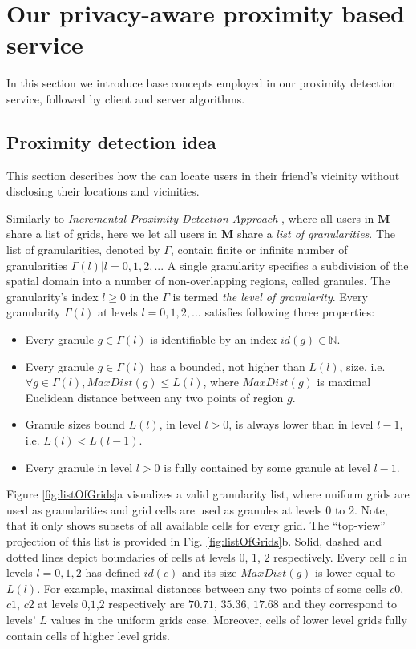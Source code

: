 \section{Our privacy-aware proximity based service} \label{sec:contribution}

In this section we introduce base concepts employed in our proximity detection
service, followed by client and server algorithms. 

\subsection{Proximity detection idea}

This section describes how the \ls can locate users in their friend's vicinity
without disclosing their locations and vicinities. 

Similarly to \textit{Incremental Proximity Detection Approach} \cite {ffinder},
where all users in $\mathbf{M}$ share a list of grids, here we let all users in
$\mathbf{M}$ share a \textit{list of granularities}. The list of granularities,
denoted by $\Gamma$, contain finite or infinite number of granularities
$\Gamma(l)| l=0, 1, 2,...$  A single granularity
specifies a subdivision of the spatial domain
into a number of non-overlapping regions, called granules\cite{pbsPaper}. The
granularity's index $l \geq 0$ in the $\Gamma$ is termed \textit{the level of
granularity}. Every granularity $\Gamma(l)$ at levels $l=0, 1, 2,...$ satisfies
following three properties:
\begin{itemize}
 \item Every granule $g \in \Gamma(l)$ is identifiable by an index $id(g)
\in \mathbb{N}$.
 \item Every granule $g \in \Gamma(l)$ has a bounded, not higher than $L(l)$,
size, i.e. $\forall g \in \Gamma(l), MaxDist(g) \leq L(l)$, where $MaxDist(g)$
is maximal Euclidean distance between any two points of region $g$.
 \item Granule sizes bound $L(l)$, in level $l>0$, is always lower than in level
$l-1$, i.e. $L(l) < L(l-1)$.
 \item Every granule in level $l>0$ is fully contained by some granule at 
level $l-1$.
\end{itemize}

Figure \ref{fig:listOfGrids}a visualizes a valid granularity
list, where uniform grids are used as granularities and grid cells are used as
granules at levels $0$ to $2$. Note, that it only shows subsets of all
available cells for every grid. The ``top-view'' projection of this list is
provided in Fig. \ref{fig:listOfGrids}b. Solid, dashed and dotted lines depict
boundaries of cells at levels $0$, $1$, $2$ respectively. Every cell $c$ in levels
$l=0,1,2$ has defined $id(c)$ and its size $MaxDist(g)$ is lower-equal to $L(l)$. 
For example, maximal distances between any two points of some 
cells $c0$,$c1$, $c2$ at levels $0$,$1$,$2$ respectively are $70.71$, $35.36$, 
$17.68$ and they correspond to levels' $L$ values in the uniform grids case. 
Moreover, cells of lower level grids fully contain cells of higher level grids.

